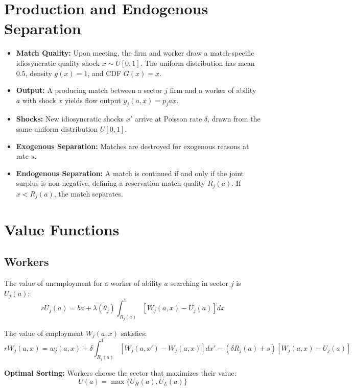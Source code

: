 \documentclass[11pt]{article}
\begin{document}
\section{Production and Endogenous Separation}
\begin{itemize}
    \item \textbf{Match Quality:} Upon meeting, the firm and worker draw a match-specific idiosyncratic quality shock $x \sim U[0, 1]$. The uniform distribution has mean $0.5$, density $g(x) = 1$, and CDF $G(x) = x$.
    \item \textbf{Output:} A producing match between a sector $j$ firm and a worker of ability $a$ with shock $x$ yields flow output $y_j(a, x) = p_j a x$.
    \item \textbf{Shocks:} New idiosyncratic shocks $x'$ arrive at Poisson rate $\delta$, drawn from the same uniform distribution $U[0, 1]$.
    \item \textbf{Exogenous Separation:} Matches are destroyed for exogenous reasons at rate $s$.
    \item \textbf{Endogenous Separation:} A match is continued if and only if the joint surplus is non-negative, defining a reservation match quality $R_{j}(a)$. If $x < R_{j}(a)$, the match separates.
\end{itemize}

\section{Value Functions}

\subsection{Workers}
The value of unemployment for a worker of ability $a$ searching in sector $j$ is $U_j(a)$:
\begin{equation}
r U_j(a) = b a + \lambda(\theta_j) \int_{R_j(a)}^1 [W_j(a, x) - U_j(a)] dx
\end{equation}

The value of employment $W_j(a, x)$ satisfies:
\begin{equation}
r W_j(a, x) = w_j(a, x) + \delta \int_{R_j(a)}^1 [W_j(a, x') - W_j(a, x)] dx' - (\delta R_j(a) + s) [W_j(a, x) - U_j(a)]
\end{equation}

\textbf{Optimal Sorting:} Workers choose the sector that maximizes their value:
\begin{equation}
U(a) = \max \{ U_H(a), U_L(a) \}
\end{equation}
\end{document}
